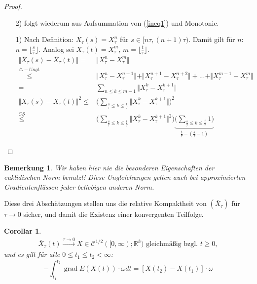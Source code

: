 \documentclass[11pt,a4paper,notitlepage]{scrreprt}
\newcommand{\RR}{\mathbb{R}}
\newcommand{\grad}{\operatorname{grad}}
\newtheorem{cor}[defi]{Corollar}
\newtheorem{bem}[defi]{Bemerkung}
\begin{document}
\begin{proof}
\begin{itemize}
\item[2)] folgt wiederum aus Aufsummation von (\ref{ineq1}) und Monotonie.
\item[1)] Nach Definition: $X_\tau(s)=X_\tau^n$ für $s\in [n\tau,(n+1)\tau)$. Damit gilt für $n$: $n=\lfloor \frac{s}{	\tau}\rfloor$. Analog sei $X_\tau(t)=X_\tau^m$, $m=\lfloor\frac{t}{\tau}\rfloor$.\\
\begin{align*}
\Vert \bar{X}_\tau(s)-\bar{X}_\tau(t)\Vert=&\Vert X_\tau^n-X_\tau^m\Vert \\\overset{\triangle -Ungl.}\leq&\Vert X_\tau^n-X_\tau^{n+1}\Vert+\Vert X_\tau^{n+1}-X_\tau^{n+2}\Vert+...+\Vert X_\tau^{m-1}-X_\tau^m\Vert\\
=&\sum_{n\leq k\leq m-1}\Vert X_\tau^k-X_\tau^{k+1}\Vert\\
\Vert X_\tau(s)-X_\tau(t)\Vert^2\leq&\Bigg(\sum_{\frac{s}{\tau}\leq k\leq \frac{t}{\tau}}\Vert X_\tau^k-X_\tau^{k+1}\Vert\Bigg)^2 \\ \overset{CS}\leq&\Bigg(\sum_{\frac{s}{\tau}\leq k\leq \frac{t}{\tau}}\Vert X_\tau^k-X_\tau^{k+1}\Vert^2\Bigg)\underset{\frac{t}{\tau}-(\frac{s}{\tau}-1)}{\underbrace{\Bigg(\sum_{\frac{s}{\tau}\leq k\leq \frac{t}{\tau}}1\Bigg)}}
\end{align*}
\end{itemize}
\end{proof}




\begin{bem}
Wir haben hier nie die besonderen Eigenschaften der euklidischen Norm benutzt! Diese Ungleichungen gelten auch bei approximierten Gradientenflüssen jeder beliebigen anderen Norm.
\end{bem}

Diese drei Abschätzungen stellen uns die relative Kompaktheit von $(\bar{X}_\tau)$ für $\tau \to 0$ sicher, und damit die Existenz einer konvergenten Teilfolge.  \\
\begin{cor}
\begin{eqnarray*}
\bar{X}_\tau(t) \overset{\tau\to0}{\longrightarrow} X \in \mathcal{C}^{1/2}([0,\infty);\RR^k) \text{ gleichmäßig bzgl. }t\geq 0,
\end{eqnarray*}
und es gilt für alle $0\leq t_1\leq t_2<\infty$:
\begin{equation}
-\int_{t_1}^{t_2}\grad E(X(t))\cdot \omega dt = [X(t_2)-X(t_1)]\cdot\omega
\end{equation}
\end{cor}
\end{document}
